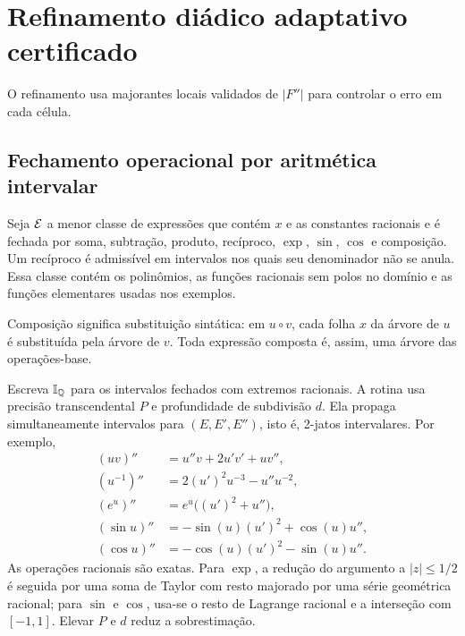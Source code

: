 \section{Refinamento diádico adaptativo certificado}
O refinamento usa majorantes locais validados de $|F''|$ para controlar o erro em cada célula.

\subsection{Fechamento operacional por aritmética intervalar}
Seja $\mathcal E$ a menor classe de expressões que contém $x$ e as constantes racionais e é fechada por soma, subtração, produto, recíproco, $\exp$, $\sin$, $\cos$ e composição. Um recíproco é admissível em intervalos nos quais seu denominador não se anula. Essa classe contém os polinômios, as funções racionais sem polos no domínio e as funções elementares usadas nos exemplos.

Composição significa substituição sintática: em $u\circ v$, cada folha $x$ da árvore de $u$ é substituída pela árvore de $v$. Toda expressão composta é, assim, uma árvore das operações-base.

Escreva $\mathbb I_{\mathbb Q}$ para os intervalos fechados com extremos racionais. A rotina
usa precisão transcendental $P$ e profundidade de subdivisão $d$. Ela propaga simultaneamente intervalos para $(E,E',E'')$, isto é, 2-jatos intervalares. Por exemplo,
\begin{align*}
(uv)''&=u''v+2u'v'+uv'',\\
(u^{-1})''&=2(u')^2u^{-3}-u''u^{-2},\\
(e^u)''&=e^u\bigl((u')^2+u''\bigr),\\
(\sin u)''&=-\sin(u)(u')^2+\cos(u)u'',\\
(\cos u)''&=-\cos(u)(u')^2-\sin(u)u''.
\end{align*}
As operações racionais são exatas. Para $\exp$, a redução do argumento a $|z|\le1/2$ é seguida por uma soma de Taylor com resto majorado por uma série geométrica racional; para $\sin$ e $\cos$, usa-se o resto de Lagrange racional e a interseção com $[-1,1]$. Elevar $P$ e $d$ reduz a sobrestimação.

